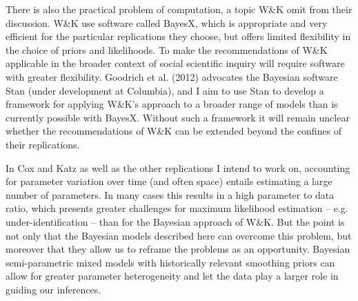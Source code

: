 There is also the practical problem of computation, a topic W\&K omit from their discussion. W\&K use software called BayesX, which is appropriate and very efficient for the particular replications they choose, but offers limited flexibility in the choice of priors and likelihoods. To make the recommendations of W\&K applicable in the broader context of social scientific inquiry will require software with greater flexibility. Goodrich et al. (2012) advocates the Bayesian software Stan (under development at Columbia), and I aim to use Stan to develop a framework for applying W\&K's approach to a broader range of models than is currently possible with BayesX.  Without such a framework it will remain unclear whether the recommendations of W\&K can be extended beyond the confines of their replications.  

In Cox and Katz as well as the other replications I intend to work on, accounting for parameter variation over time (and often space) entails estimating a large number of parameters. In many cases this results in a high parameter to data ratio, which presents greater challenges for maximum likelihood estimation -- e.g. under-identification -- than for the Bayesian approach of W\&K. But the point is not only that the Bayesian models described here can overcome this problem, but moreover that they allow us to reframe the problems as an opportunity. Bayesian semi-parametric mixed models with historically relevant smoothing priors can allow for greater parameter heterogeneity and let the data play a larger role in guiding our inferences.   